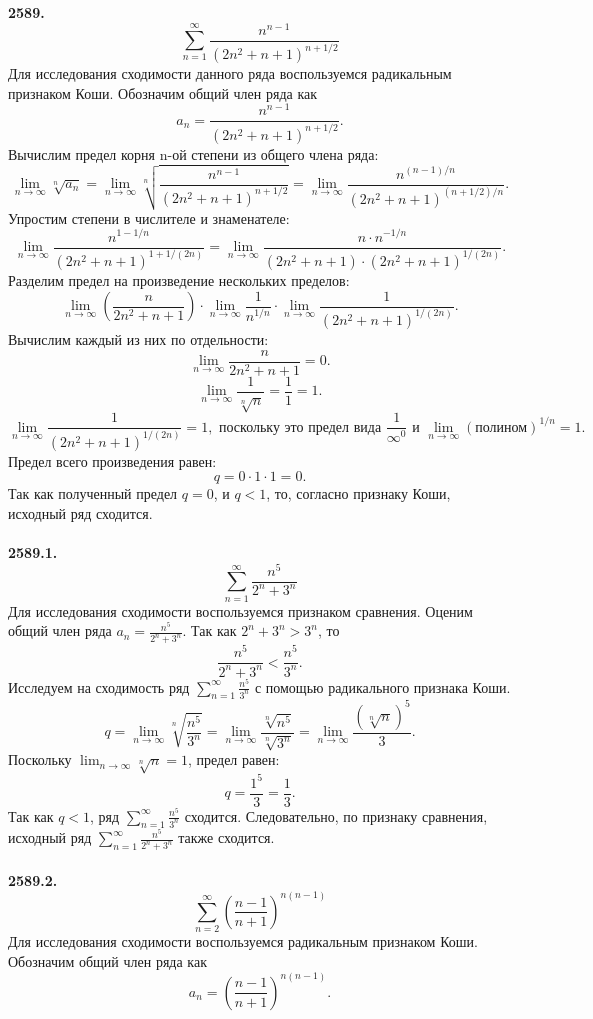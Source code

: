 \documentclass[a4paper, 12pt]{report}
\numberwithin{equation}{section}
\begin{document}
	\textbf{2589.}
	$$\sum_{n=1}^{\infty} \frac{n^{n-1}}{(2n^2+n+1)^{n+1/2}}$$
	Для исследования сходимости данного ряда воспользуемся радикальным признаком Коши. Обозначим общий член ряда как
	$$a_n = \frac{n^{n-1}}{(2n^2+n+1)^{n+1/2}}.$$
	Вычислим предел корня n-ой степени из общего члена ряда:
	$$ \lim_{n \to \infty} \sqrt[n]{a_n} = \lim_{n \to \infty} \sqrt[n]{\frac{n^{n-1}}{(2n^2+n+1)^{n+1/2}}} = \lim_{n \to \infty} \frac{n^{(n-1)/n}}{(2n^2+n+1)^{(n+1/2)/n}}. $$
	Упростим степени в числителе и знаменателе:
	$$ \lim_{n \to \infty} \frac{n^{1-1/n}}{(2n^2+n+1)^{1+1/(2n)}} = \lim_{n \to \infty} \frac{n \cdot n^{-1/n}}{(2n^2+n+1) \cdot (2n^2+n+1)^{1/(2n)}}. $$
	Разделим предел на произведение нескольких пределов:
	$$ \lim_{n \to \infty} \left(\frac{n}{2n^2+n+1}\right) \cdot \lim_{n \to \infty} \frac{1}{n^{1/n}} \cdot \lim_{n \to \infty} \frac{1}{(2n^2+n+1)^{1/(2n)}}. $$
	Вычислим каждый из них по отдельности:
	$$ \lim_{n \to \infty} \frac{n}{2n^2+n+1} = 0. $$
	$$ \lim_{n \to \infty} \frac{1}{\sqrt[n]{n}} = \frac{1}{1} = 1. $$
	$$ \lim_{n \to \infty} \frac{1}{(2n^2+n+1)^{1/(2n)}} = 1, \text{ поскольку это предел вида } \frac{1}{\infty^0} \text{ и } \lim_{n \to \infty} (\text{полином})^{1/n} = 1. $$
	Предел всего произведения равен:
	$$ q = 0 \cdot 1 \cdot 1 = 0. $$
	Так как полученный предел $q = 0$, и $q < 1$, то, согласно признаку Коши, исходный ряд сходится.
	\\\\
	\textbf{2589.1.}
	$$\sum_{n=1}^{\infty} \frac{n^5}{2^n + 3^n}$$
	Для исследования сходимости воспользуемся признаком сравнения. Оценим общий член ряда $a_n = \frac{n^5}{2^n + 3^n}$.
	Так как $2^n + 3^n > 3^n$, то
	$$ \frac{n^5}{2^n + 3^n} < \frac{n^5}{3^n}. $$
	Исследуем на сходимость ряд $\sum_{n=1}^{\infty} \frac{n^5}{3^n}$ с помощью радикального признака Коши.
	$$ q = \lim_{n \to \infty} \sqrt[n]{\frac{n^5}{3^n}} = \lim_{n \to \infty} \frac{\sqrt[n]{n^5}}{\sqrt[n]{3^n}} = \lim_{n \to \infty} \frac{(\sqrt[n]{n})^5}{3}. $$
	Поскольку $\lim_{n \to \infty} \sqrt[n]{n} = 1$, предел равен:
	$$ q = \frac{1^5}{3} = \frac{1}{3}. $$
	Так как $q < 1$, ряд $\sum_{n=1}^{\infty} \frac{n^5}{3^n}$ сходится. Следовательно, по признаку сравнения, исходный ряд $\sum_{n=1}^{\infty} \frac{n^5}{2^n + 3^n}$ также сходится.
	\\\\
	\textbf{2589.2.}
	$$\sum_{n=2}^{\infty} \left(\frac{n-1}{n+1}\right)^{n(n-1)}$$
	Для исследования сходимости воспользуемся радикальным признаком Коши. Обозначим общий член ряда как
	$$a_n = \left(\frac{n-1}{n+1}\right)^{n(n-1)}.$$
\end{document}

